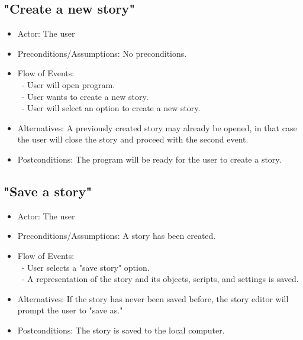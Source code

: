 \documentclass[12pt]{article}
\begin{document}
	\subsection{"Create a new story"}
\begin{itemize}
	\item Actor: The user
	\item Preconditions/Assumptions: No preconditions.
	\item Flow of Events: \\
	 	\ - User will open program. \\
		\ - User wants to create a new story. \\
		\ - User will select an option to create a new story.
	
	\item Alternatives: A previously created story may already be opened, in that case the user will close the story and proceed with the second event.
	\item Postconditions: The program will be ready for the user to create a story.
\end{itemize}

		\subsection{"Save a story"}
\begin{itemize}
	\item Actor: The user
		\item Preconditions/Assumptions: A story has been created.
	\item Flow of Events: \\
	\	- User selects a "save story" option. \\
	\	- A representation of the story and its objects, scripts, and settings is saved.
	\item Alternatives: If the story has never been saved before, the story editor will prompt
	the user to "save as."
	\item Postconditions: The story is saved to the local computer.
\end{itemize}
	
\end{document}
